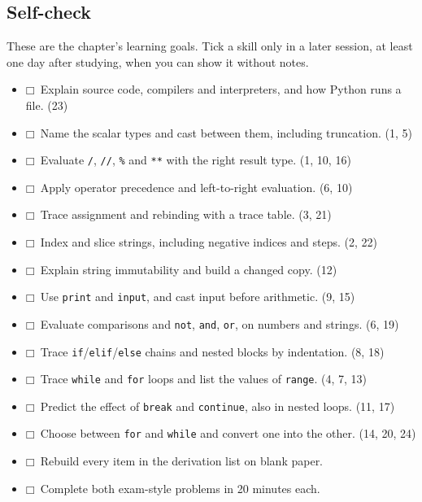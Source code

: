\documentclass[11pt]{article}
\begin{document}
\begin{keepsection}
\section{Self-check}

These are the chapter’s learning goals. Tick a skill only in a later session, at least one day after studying, when you can show it without notes.

\begin{itemize}
\item $\mdlgwhtsquare$\ Explain source code, compilers and interpreters, and how Python runs a file. (23)
\item $\mdlgwhtsquare$\ Name the scalar types and cast between them, including truncation. (1, 5)
\item $\mdlgwhtsquare$\ Evaluate \texttt{/}, \texttt{//}, \texttt{\%} and \texttt{**} with the right result type. (1, 10, 16)
\item $\mdlgwhtsquare$\ Apply operator precedence and left-to-right evaluation. (6, 10)
\item $\mdlgwhtsquare$\ Trace assignment and rebinding with a trace table. (3, 21)
\item $\mdlgwhtsquare$\ Index and slice strings, including negative indices and steps. (2, 22)
\item $\mdlgwhtsquare$\ Explain string immutability and build a changed copy. (12)
\item $\mdlgwhtsquare$\ Use \texttt{print} and \texttt{input}, and cast input before arithmetic. (9, 15)
\item $\mdlgwhtsquare$\ Evaluate comparisons and \texttt{not}, \texttt{and}, \texttt{or}, on numbers and strings. (6, 19)
\item $\mdlgwhtsquare$\ Trace \texttt{if}/\texttt{elif}/\texttt{else} chains and nested blocks by indentation. (8, 18)
\item $\mdlgwhtsquare$\ Trace \texttt{while} and \texttt{for} loops and list the values of \texttt{range}. (4, 7, 13)
\item $\mdlgwhtsquare$\ Predict the effect of \texttt{break} and \texttt{continue}, also in nested loops. (11, 17)
\item $\mdlgwhtsquare$\ Choose between \texttt{for} and \texttt{while} and convert one into the other. (14, 20, 24)
\item $\mdlgwhtsquare$\ Rebuild every item in the derivation list on blank paper.
\item $\mdlgwhtsquare$\ Complete both exam-style problems in 20 minutes each.
\end{itemize}
\end{keepsection}
\end{document}
